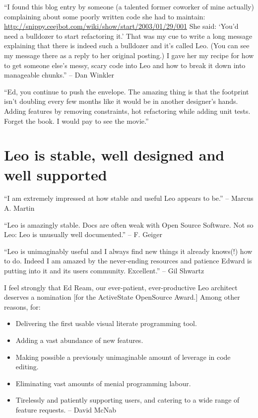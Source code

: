 \documentclass[a4paper,10pt,english]{sphinxmanual}
\begin{document}
``I found this blog entry by someone (a talented former coworker of mine
actually) complaining about some poorly written code she had to maintain:
\href{http://snippy.ceejbot.com/wiki/show/start/2003/01/29/001}{http://snippy.ceejbot.com/wiki/show/start/2003/01/29/001} She said: `You'd need a
bulldozer to start refactoring it.' That was my cue to write a long message
explaining that there is indeed such a bulldozer and it's called Leo. (You can
see my message there as a reply to her original posting.) I gave her my recipe
for how to get someone else's messy, scary code into Leo and how to break it
down into manageable chunks.'' -- Dan Winkler

``Ed, you continue to push the envelope. The amazing thing is that the footprint
isn't doubling every few months like it would be in another designer's hands.
Adding features by removing constraints, hot refactoring while adding unit
tests. Forget the book. I would pay to see the movie.''


\section{Leo is stable, well designed and well supported}
\label{testimonials:leo-is-stable-well-designed-and-well-supported}
``I am extremely impressed at how stable and useful Leo appears to be.'' -- Marcus
A. Martin

``Leo is amazingly stable. Docs are often weak with Open Source Software. Not so
Leo: Leo is unusually well documented.'' -- F. Geiger

``Leo is unimaginably useful and I always find new things it already knows(!) how
to do. Indeed I am amazed by the never-ending resources and patience Edward is
putting into it and its users community. Excellent.'' -- Gil Shwartz

I feel strongly that Ed Ream, our ever-patient, ever-productive Leo architect
deserves a nomination {[}for the ActiveState OpenSource Award.{]} Among other
reasons, for:
\begin{itemize}
\item {} 
Delivering the first usable visual literate programming tool.

\item {} 
Adding a vast abundance of new features.

\item {} 
Making possible a previously unimaginable amount of leverage in code editing.

\item {} 
Eliminating vast amounts of menial programming labour.

\item {} 
Tirelessly and patiently supporting users, and catering to a wide range of
feature requests. -- David McNab

\end{itemize}
\end{document}
